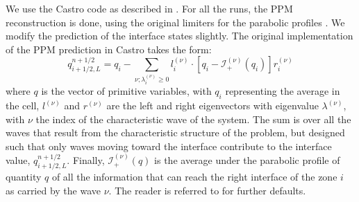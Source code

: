 \documentclass[12pt,preprint]{aastex}
\begin{document}
We use the Castro code as described in \citet{castro}.  For all the
runs, the PPM reconstruction is done, using the original limiters for
the parabolic profiles \citep{ppm}.  We modify the prediction of the
interface states slightly.  The original implementation of the PPM
prediction in Castro takes the form:
\begin{equation}
q_{i+1/2,L}^{n+1/2} = q_i -
   \sum_{\nu;\lambda_i^{(\nu)}\ge 0} l_i^{(\nu)} \cdot \left [
        q_i - \mathcal{I}_+^{(\nu)}(q_i)
       \right ] r_i^{(\nu)}
\end{equation}
where $q$ is the vector of primitive variables, with $q_i$
representing the average in the cell, $l^{(\nu)}$ and $r^{(\nu)}$ are
the left and right eigenvectors with eigenvalue $\lambda^{(\nu)}$,
with $\nu$ the index of the characteristic wave of the system.  The
sum is over all the waves that result from the characteristic
structure of the problem, but designed such that only waves moving
toward the interface contribute to the interface value,
$q_{i+1/2,L}^{n+1/2}$.  Finally, $\mathcal{I}_+^{(\nu)}(q)$ is the
average under the parabolic profile of quantity $q$ of all the information
that can reach the right interface of the zone $i$ as carried by the wave
$\nu$.   The reader is referred to
\citet{ppmunsplit} for further defaults.
\end{document}
